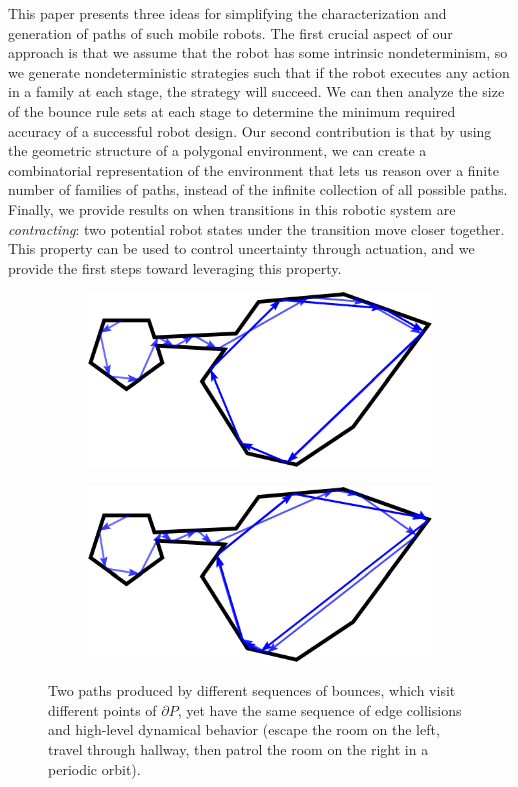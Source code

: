 \documentclass[]{styles/svproc}  %
\begin{document}
This paper presents three ideas for simplifying the characterization and
generation of paths of such mobile robots. The first crucial
aspect of our approach is that we assume that the robot has some intrinsic
nondeterminism, so we generate nondeterministic strategies such that if the
robot executes any action in a family at each stage, the strategy will succeed.
We can then analyze the size of the bounce rule sets at each stage to
determine the minimum required accuracy of a successful robot design.
Our second contribution is that by using the geometric
structure of a polygonal environment, we can create a combinatorial
representation of the environment that lets us reason over a finite number of
families of paths, instead of the infinite collection of all possible paths.
Finally, we provide results on when transitions in this robotic system are 
\emph{contracting}: two potential robot states under the transition move closer together. 
This property can be used to control uncertainty through actuation, and we
provide the first steps toward leveraging this property.

\begin{figure}
\centering
\begin{subfigure}{0.5\textwidth}
\includegraphics[width=\linewidth]{figures/twoc_a}
\end{subfigure}%
\begin{subfigure}{0.5\textwidth}
\includegraphics[width=\linewidth]{figures/twoc_b}
\end{subfigure}
\caption{Two paths produced by different sequences of bounces, which visit
different points of $\partial P$, yet have the same sequence of edge collisions 
and high-level dynamical behavior (escape the room on the left, travel through hallway, then
patrol the room on the right in a periodic orbit).
}

\label{fig:twopaths}
\end{figure}
\end{document}
